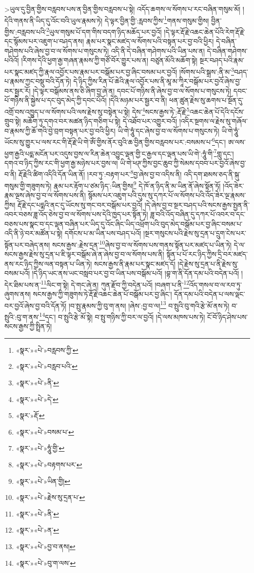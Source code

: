  >ཡུལ་དུ་བྱིན་གྱིས་བརླབས་པས་ན་བྱིན་གྱིས་བརླབས་པ་སྟེ། འདོད་ཆགས་ལ་སོགས་པ་རང་བཞིན་གསུམ་མོ། །དེའི་གནས་ནི་ཡིད་དུ་འོང་བའི་ཡུལ་རྣམས་ཏེ། དེ་ལྟར་བྱིན་གྱི་:རླབས་ཀྱིས་\footnote{«སྣར་»«པེ་»བརླབས་ཀྱི་}གནས་གསུམ་གྱིས། བྱིན་གྱིས་:བརླབས་པའི་\footnote{«སྣར་»«པེ་»བརླབ་པའི་}ཡུལ་གསུམ་པོ་དག་གིས་བདག་ཉིད་མཆོད་པར་བྱའོ། །དེ་ལྟར་རྡོ་རྗེ་འཆང་ཆེན་པོའི་རེག་རྡོ་རྗེ་དང་སྙོམས་པར་འཇུག་པ་བཤད་ནས། རྣམ་པར་སྣང་མཛད་ལ་སོགས་པའི་བསྟན་པར་བྱ་བའི་ཕྱིར། དེ་བཞིན་གཤེགས་པའི་ཞེས་བྱ་བ་ལ་སོགས་པ་གསུངས་ཏེ། འདི་ནི་དེ་བཞིན་གཤེགས་པའི་ཡིན་པས་ན། དེ་བཞིན་གཤེགས་པའིའོ། །རིགས་དེའི་ཕྱག་རྒྱ་གཞན་རྣམས་ཀྱི་གཙོ་བོར་གྱུར་པས་ན། བཙུན་མོའི་མཆོག་སྟེ། སྔར་བཤད་པའི་རྣམ་པར་སྣང་མཛད་ཀྱི་རྣལ་འབྱོར་པས་རྣམ་པར་བསྒོམ་པར་བྱ་ཞིང་བསམ་པར་བྱའོ། །སོགས་པའི་སྒྲས་:ནི་མ་\footnote{«སྣར་»«པེ་»ནི་}བཤད་པ་རྣམས་ཀྱང་བསྡུ་བའི་དོན་ཏེ། དེ་ཉིད་ཀྱིས་རིན་པོ་ཆེའི་རྣལ་འབྱོར་པས་ནི་མཱ་མ་ཀཱིར་བསྒོམ་པར་བྱའོ་ཞེས་བྱ་བར་སྦྱར་རོ། །དེ་ལྟར་བསྒོམས་ནས་ཅི་ཞིག་བྱ་ཞེ་ན། དབང་པོ་གཉིས་ནི་ཞེས་བྱ་བ་ལ་སོགས་པ་གསུངས་ཏེ། དབང་པོ་གཉིས་ནི་སྐྱེས་པ་དང་བུད་མེད་ཀྱི་དབང་པོའོ། །དེའི་མཉམ་པར་སྦྱར་བ་ནི། ཕན་ཚུན་རྗེས་སུ་ཆགས་པ་སྔོན་དུ་འགྲོ་བས་འཁྱུད་པ་ལ་སོགས་པའི་ལས་རྗེས་སུ་བསྟེན་པ་སྟེ། དེས་\footnote{«སྣར་»«པེ་»དེ་}སངས་རྒྱས་ཏེ་:རྡོ་རྗེ་\footnote{«སྣར་»རྡོ་}འཆང་ཆེན་པོ་དེའི་དངོས་གྲུབ་སྟེ། མཆོག་ཏུ་དགའ་བར་མཚན་ཉིད་གཅིག་པ་སྟེ། དེ་འཐོབ་པར་འགྱུར་བའོ། །འདིར་སྔགས་ལ་རྗེས་སུ་གཞོལ་བ་རྣམས་ཀྱི་ཆོ་གའི་བྱེ་བྲག་བསྟན་པར་བྱ་བའི་ཕྱིར། ཡི་གེ་ཧཱུཾ་དང་ཞེས་བྱ་བ་ལ་སོགས་པ་གསུངས་ཏེ། ཡི་གེ་ཧཱུཾ་ཡོངས་སུ་གྱུར་པ་ལས་རང་གི་རྡོ་རྗེ་ཡི་གེ་ཨོཾ་གྱིས་ནོར་བུའི་ཆ་བྱིན་གྱིས་བརླབས་པར་:བསམས་པ་\footnote{«སྣར་»«པེ་»བསམ་པ་}དང་། ཨ་ལས་ཕྱག་རྒྱའི་པདྨ་མངོན་པར་འདུས་བྱས་ལ་རིན་ཆེན་འབྱུང་ལྡན་གྱི་ང་རྒྱལ་དང་ལྡན་པས་ཡི་གེ་:ཧཱུཾ་གི་\footnote{«སྣར་»«པེ་»ཧཱུཾ་གྱི་}གླུ་དང་། དགའ་བ་ཉིད་ཀྱིས་རང་གི་ཕྱག་རྒྱ་མཉེས་པར་བྱས་ལ། ཡི་གེ་ཕཊ་ཀྱིས་བྱང་ཆུབ་ཀྱི་སེམས་དབབ་པར་བྱའོ་ཞེས་བྱ་བ་ནི། རྡོ་རྗེའི་ཚིག་འདིའི་དོན་ཡིན་ནོ། །རབ་ཏུ་:བརྟག་པར་\footnote{«སྣར་»«པེ་»བརྟགས་པར་}བྱ་ཞེས་བྱ་བ་འདིས་ནི། འདི་དག་ཐམས་ཅད་ནི་སྐུ་གསུམ་གྱི་གཟུགས་ཏེ། རྣམ་པར་རྟོག་པ་ཙམ་ཉིད་:ཡིན་གྱིས།\footnote{«སྣར་»«པེ་»ཡིན་གྱི།} དེ་ཁོ་ན་ཉིད་ནི་མ་ཡིན་ནོ་ཞེས་སྟོན་ཏོ། །འོད་ཟེར་རྣམ་ལྔས་ཞེས་བྱ་བ་ལ་སོགས་པས་ནི། སྙོམས་པར་འཇུག་པའི་དུས་སུ་དཀར་པོ་ལ་སོགས་པའི་འོད་ཟེར་ལྔ་རྣམས་ཀྱིས། རྡོ་རྗེ་དང་པདྨའི་ནང་དུ་ཡོངས་སུ་གང་བར་བསྒོམ་པར་བྱའོ། །དེ་ཞེས་བྱ་བ་སྔར་བཤད་པའི་སངས་རྒྱས་སྤྱན་ནི་འབར་བཅས་ཟླ་འོད་ཅེས་བྱ་བ་ལ་སོགས་པས་དེའི་ཁྱད་པར་སྟོན་ཏེ། ཟླ་བའི་འོད་བཞིན་དུ་དཀར་པོ་འབར་བ་དང་བཅས་པས་སྣང་བ་དང་ལྡན་བཞིན་པར་ཡིད་དུ་འོང་ཞིང་ཡིད་འཕྲོག་པའི་བུད་མེད་བསྒོམ་པར་བྱ་ཞིང་བསམ་པ་འདི་ནི་ཉེ་བར་མཚོན་པ་སྟེ། དགོངས་པ་མ་ཡིན་པས་བཤད་པའོ། །སྔར་གསུངས་པའི་རྗེས་སུ་དྲན་པ་དྲུག་ངེས་པར་སྟོན་པར་བཞེད་ནས། སངས་རྒྱས་:རྗེས་དྲན་\footnote{«སྣར་»«པེ་»རྗེས་སུ་དྲན་པ་}ཞེས་བྱ་བ་ལ་སོགས་པས་གནས་སྟོན་པར་མཛད་པ་ཡིན་ཏེ། དེ་ལ་སངས་རྒྱས་རྗེས་སུ་དྲན་པ་ཇི་ལྟར་བསྒོམ་ཞེ་ན་ཞེས་བྱ་བ་ལ་སོགས་པས་ནི། སྟོན་པ་པོ་རང་ཉིད་ཀྱིས་དྲི་བར་མཛད་ནས་རང་ཉིད་ཀྱིས་ལན་བསྟན་པ་ཡིན་ཏེ། སངས་རྒྱས་ནི་རྣམ་པར་སྣང་མཛད་དོ། །དེ་རྗེས་སུ་དྲན་པ་ནི་རྗེས་སུ་བསམ་པའོ། །དེ་ཉིད་ཡང་ནས་ཡང་བསླབ་པར་བྱ་བ་ཡིན་པས་བསྒོམ་པའོ། །བྷ་ག་ནི་དོན་དམ་པའི་བདེན་པའོ། །དེར་ཐིམ་པས་ན་\footnote{«སྣར་»«པེ་»ནི་}ལིང་ག་སྟེ། དེ་གང་ཞེ་ན། ཀུན་རྫོབ་ཀྱི་བདེན་པའོ། །བཞག་པ་ནི་\footnote{«སྣར་»«པེ་»ན་}འོད་གསལ་བ་ལ་རབ་ཏུ་ཞུགས་ནས། སངས་རྒྱས་ཀྱི་གཟུགས་ཏེ་རྡོ་རྗེ་འཆང་ཆེན་པོ་བསྒོམ་པར་བྱ་ཞིང་། དོན་དམ་པའི་བདེན་པ་ལས་ལྡང་བར་བྱའོ་ཞེས་བྱ་བའི་དོན་ཏོ། །བ་སྤུ་རྣམས་ཀྱི་བུ་ག་ནས། །ཞེས་:བྱ་བ་ལ།\footnote{«སྣར་»«པེ་»བྱ་བ་ནས།} བ་སྤུའི་བུ་གའི་རྩེ་མོ་ནས་ཏེ། བ་སྤུའི་:བུ་ག་ནས་\footnote{«སྣར་»«པེ་»བུ་ག་ལས་}དང་། བ་སྤུའི་རྩེ་མོ་སྟེ། བ་སྤུ་གཉིས་ཀྱི་བར་ལ་བྱའོ། །དེ་ལས་མཁས་པས་ཏེ། ངོ་བོ་ཉིད་ཤེས་པས་སངས་རྒྱས་ཀྱི་སྤྲིན་ཏེ། 